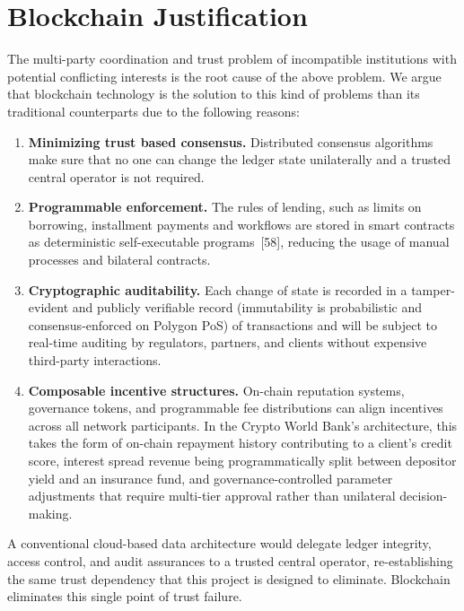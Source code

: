 \documentclass[12pt,a4paper]{report}
\begin{document}
\section{Blockchain Justification}

The multi-party coordination and trust problem of incompatible institutions with potential conflicting interests is the root cause of the above problem. We argue that blockchain technology is the solution to this kind of problems than its traditional counterparts due to the following reasons:

\begin{enumerate}[noitemsep]
\item \textbf{Minimizing trust based consensus.} Distributed consensus algorithms make sure that no one can change the ledger state unilaterally and a trusted central operator is not required.

\item \textbf{Programmable enforcement.} The rules of lending, such as limits on borrowing, installment payments and workflows are stored in smart contracts as deterministic self-executable programs~[58], reducing the usage of manual processes and bilateral contracts.

\item \textbf{Cryptographic auditability.} Each change of state is recorded in a tamper-evident and publicly verifiable record (immutability is probabilistic and consensus-enforced on Polygon PoS) of transactions and will be subject to real-time auditing by regulators, partners, and clients without expensive third-party interactions.

\item \textbf{Composable incentive structures.} On-chain reputation systems, governance tokens, and programmable fee distributions can align incentives across all network participants. In the Crypto World Bank's architecture, this takes the form of on-chain repayment history contributing to a client's credit score, interest spread revenue being programmatically split between depositor yield and an insurance fund, and governance-controlled parameter adjustments that require multi-tier approval rather than unilateral decision-making.
\end{enumerate}

A conventional cloud-based data architecture would delegate ledger integrity, access control, and audit assurances to a trusted central operator, re-establishing the same trust dependency that this project is designed to eliminate. Blockchain eliminates this single point of trust failure.
\end{document}
